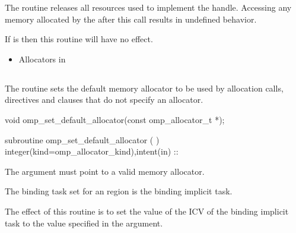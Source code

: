 \effect

The  routine releases all resources used to implement the  handle. Accessing any memory allocated by the  after this call results in undefined behavior.

If  is  then this routine will have no effect.
 
\crossreferences
\begin{itemize}
\item Allocators in 
\end{itemize}


\subsection{}
\label{subsec:omp_set_default_allocator}

\summary
The  routine sets the default memory allocator to be used by allocation calls,  directives and  clauses that do not specify an allocator.

\format
\begin{ccppspecific}
\begin{ompcFunction}
void omp_set_default_allocator(const omp_allocator_t *);
\end{ompcFunction}
\end{ccppspecific}
\begin{fortranspecific}
\begin{ompfSubroutine}
subroutine omp_set_default_allocator (  )
integer(kind=omp_allocator_kind),intent(in) :: 
\end{ompfSubroutine}
\end{fortranspecific}

\constraints

The  argument must point to a valid memory allocator.

\binding
The binding task set for an  region is the binding implicit task.

\effect

The effect of this routine is to set the value of the  ICV of the binding implicit task to the value specified in the  argument.

